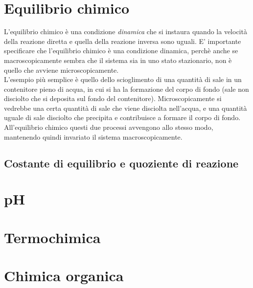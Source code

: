 \documentclass[12pt]{article}
\begin{document}
\section{Equilibrio chimico}
L'equilibrio chimico è una condizione \textit{dinamica} che si instaura quando la velocità della reazione diretta e quella della reazione inversa sono uguali. E' importante specificare che l'equilibrio
chimico è una condizione dinamica, perchè anche se macroscopicamente sembra che il sistema sia in uno stato stazionario, non è quello che avviene microscopicamente. \\
L'esempio più semplice è quello dello scioglimento di una quantità di sale in un contenitore pieno di acqua, in cui si ha la formazione del corpo di fondo (sale non disciolto che si deposita sul 
fondo del contenitore). Microscopicamente si vedrebbe una certa quantità di sale che viene disciolta nell'acqua, e una quantità uguale di sale disciolto che precipita e contribuisce a formare il corpo 
di fondo. All'equilibrio chimico questi due processi avvengono allo stesso modo, mantenendo quindi invariato il sistema macroscopicamente.
\subsection{Costante di equilibrio e quoziente di reazione} 
\section{pH}
\section{Termochimica}
\section{Chimica organica}
\end{document}
